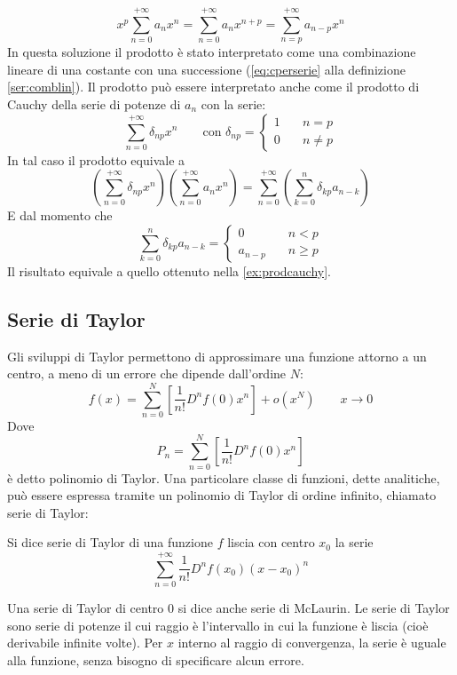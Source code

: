 \begin{examp}
	\begin{equation}
		\label{ex:prodcauchy}
		x^p\sum_{n=0}^{+\infty}a_nx^n=\sum_{n=0}^{+\infty}a_nx^{n+p}=\sum_{n=p}^{+\infty}a_{n-p}x^n
	\end{equation}
	In questa soluzione il prodotto è stato interpretato come una combinazione lineare di una costante con una successione (\ref{eq:cperserie} alla definizione \ref{ser:comblin}). Il prodotto può essere interpretato anche come il prodotto di Cauchy della serie di potenze di $a_n$ con la serie:
	\[
		\sum_{n=0}^{+\infty}\delta_{np}x^n\qquad\text{con }\delta_{np}=
		\begin{cases}
			1\quad & n=p     \\
			0\quad & n\neq p
		\end{cases}
	\]
	In tal caso il prodotto equivale a
	\[
		\left(\sum_{n=0}^{+\infty}\delta_{np}x^n\right)\left(\sum_{n=0}^{+\infty}a_nx^n\right)=\sum_{n=0}^{+\infty}\left(\sum_{k=0}^n \delta_{kp}a_{n-k}\right)
	\]
	E dal momento che
	\[
		\sum_{k=0}^n \delta_{kp}a_{n-k}=
		\begin{cases}
			0\quad       & n<p     \\
			a_{n-p}\quad & n\geq p
		\end{cases}
	\]
	Il risultato equivale a quello ottenuto nella \ref{ex:prodcauchy}.
\end{examp}


\subsection{Serie di Taylor}
Gli sviluppi di Taylor permettono di approssimare una funzione attorno a un centro, a meno di un errore che dipende dall'ordine $N$:
\[
	f(x)=\sum_{n=0}^N\left[\frac{1}{n!}D^nf(0)x^n\right]+o(x^N)\qquad x\to0
\]
Dove
\[
	P_n=\sum_{n=0}^N\left[\frac{1}{n!}D^nf(0)x^n\right]
\]
è detto polinomio di Taylor. Una particolare classe di funzioni, dette analitiche, può essere espressa tramite un polinomio di Taylor di ordine infinito, chiamato serie di Taylor:
\begin{defin}
	Si dice serie di Taylor di una funzione $f$ liscia con centro $x_0$ la serie
	\begin{equation}
		\sum_{n=0}^{+\infty}\frac{1}{n!}D^nf(x_0)(x-x_0)^n
	\end{equation}
\end{defin}
Una serie di Taylor di centro $0$ si dice anche serie di McLaurin. Le serie di Taylor sono serie di potenze il cui raggio è l'intervallo in cui la funzione è liscia (cioè derivabile infinite volte). Per $x$ interno al raggio di convergenza, la serie è uguale alla funzione, senza bisogno di specificare alcun errore.

